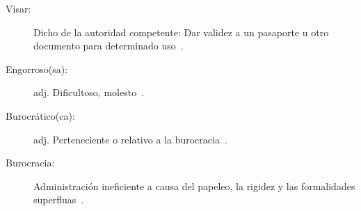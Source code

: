 \begin{glosario}
	\item 	\begin{description}
			    \item[Visar:] Dicho de la autoridad competente: Dar validez a un pasaporte u otro documento para determinado uso~\cite{4}.
			\end{description} 

	\item 	\begin{description}
			    \item[Engorroso(sa):] adj. Dificultoso, molesto~\cite{14}.
			\end{description}
	
	\item 	\begin{description}
			    \item[Burocrático(ca):] adj. Perteneciente o relativo a la burocracia~\cite{15}.
			\end{description}
	
	\item 	\begin{description}
			    \item[Burocracia:] Administración ineficiente a causa del papeleo, la rigidez y las 
				formalidades superfluas~\cite{16}.
			\end{description}

\end{glosario}
